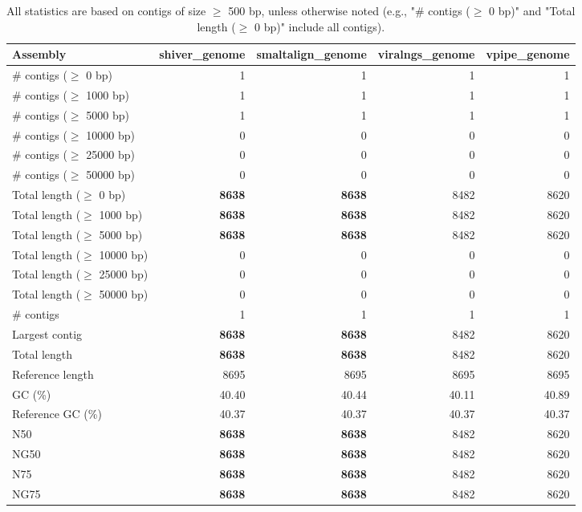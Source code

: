 \documentclass[12pt,a4paper]{article}
\begin{document}
\begin{table}[ht]
\begin{center}
\caption{All statistics are based on contigs of size $\geq$ 500 bp, unless otherwise noted (e.g., "\# contigs ($\geq$ 0 bp)" and "Total length ($\geq$ 0 bp)" include all contigs).}
\begin{tabular}{|l*{4}{|r}|}
\hline
Assembly & shiver\_genome & smaltalign\_genome & viralngs\_genome & vpipe\_genome \\ \hline
\# contigs ($\geq$ 0 bp) & 1 & 1 & 1 & 1 \\ \hline
\# contigs ($\geq$ 1000 bp) & 1 & 1 & 1 & 1 \\ \hline
\# contigs ($\geq$ 5000 bp) & 1 & 1 & 1 & 1 \\ \hline
\# contigs ($\geq$ 10000 bp) & 0 & 0 & 0 & 0 \\ \hline
\# contigs ($\geq$ 25000 bp) & 0 & 0 & 0 & 0 \\ \hline
\# contigs ($\geq$ 50000 bp) & 0 & 0 & 0 & 0 \\ \hline
Total length ($\geq$ 0 bp) & {\bf 8638} & {\bf 8638} & 8482 & 8620 \\ \hline
Total length ($\geq$ 1000 bp) & {\bf 8638} & {\bf 8638} & 8482 & 8620 \\ \hline
Total length ($\geq$ 5000 bp) & {\bf 8638} & {\bf 8638} & 8482 & 8620 \\ \hline
Total length ($\geq$ 10000 bp) & 0 & 0 & 0 & 0 \\ \hline
Total length ($\geq$ 25000 bp) & 0 & 0 & 0 & 0 \\ \hline
Total length ($\geq$ 50000 bp) & 0 & 0 & 0 & 0 \\ \hline
\# contigs & 1 & 1 & 1 & 1 \\ \hline
Largest contig & {\bf 8638} & {\bf 8638} & 8482 & 8620 \\ \hline
Total length & {\bf 8638} & {\bf 8638} & 8482 & 8620 \\ \hline
Reference length & 8695 & 8695 & 8695 & 8695 \\ \hline
GC (\%) & 40.40 & 40.44 & 40.11 & 40.89 \\ \hline
Reference GC (\%) & 40.37 & 40.37 & 40.37 & 40.37 \\ \hline
N50 & {\bf 8638} & {\bf 8638} & 8482 & 8620 \\ \hline
NG50 & {\bf 8638} & {\bf 8638} & 8482 & 8620 \\ \hline
N75 & {\bf 8638} & {\bf 8638} & 8482 & 8620 \\ \hline
NG75 & {\bf 8638} & {\bf 8638} & 8482 & 8620 \\ \hline

\end{tabular}
\end{center}
\end{table}
\end{document}
